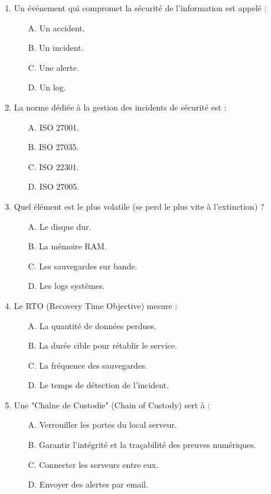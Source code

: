 \begin{enumerate}
    \item Un événement qui compromet la sécurité de l'information est appelé :
    \begin{itemize}
        \item[A.] Un accident.
        \item[B.] Un incident.
        \item[C.] Une alerte.
        \item[D.] Un log.
    \end{itemize}

    \item La norme dédiée à la gestion des incidents de sécurité est :
    \begin{itemize}
        \item[A.] ISO 27001.
        \item[B.] ISO 27035.
        \item[C.] ISO 22301.
        \item[D.] ISO 27005.
    \end{itemize}

    \item Quel élément est le plus volatile (se perd le plus vite à l'extinction) ?
    \begin{itemize}
        \item[A.] Le disque dur.
        \item[B.] La mémoire RAM.
        \item[C.] Les sauvegardes sur bande.
        \item[D.] Les logs systèmes.
    \end{itemize}

    \item Le RTO (Recovery Time Objective) mesure :
    \begin{itemize}
        \item[A.] La quantité de données perdues.
        \item[B.] La durée cible pour rétablir le service.
        \item[C.] La fréquence des sauvegardes.
        \item[D.] Le temps de détection de l'incident.
    \end{itemize}

    \item Une "Chaîne de Custodie" (Chain of Custody) sert à :
    \begin{itemize}
        \item[A.] Verrouiller les portes du local serveur.
        \item[B.] Garantir l'intégrité et la traçabilité des preuves numériques.
        \item[C.] Connecter les serveurs entre eux.
        \item[D.] Envoyer des alertes par email.
    \end{itemize}


\end{enumerate}
